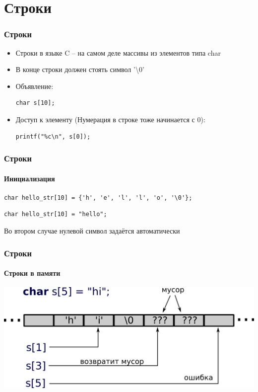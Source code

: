 \documentclass[12pt,pdf,hyperref={unicode}]{beamer}
\begin{document}
\section{Строки}

\begin{frame}[fragile]
\frametitle{Строки} 
\begin{itemize}
\item Строки в языке C -- на самом деле массивы из элементов типа char
\item В конце строки должен стоять символ '\textbackslash 0'
\item Объявление:
\begin{lstlisting}
char s[10];
\end{lstlisting}
\item Доступ к элементу
(Нумерация в строке тоже начинается с 0):\\
\begin{lstlisting}
printf("%c\n", s[0]);
\end{lstlisting}
\end{itemize}
\end{frame}


\begin{frame}[fragile]
\frametitle{Строки} 
\framesubtitle{Инициализация}
\begin{lstlisting}
char hello_str[10] = {'h', 'e', 'l', 'l', 'o', '\0'};
\end{lstlisting}
\begin{lstlisting}
char hello_str[10] = "hello";
\end{lstlisting}
Во втором случае нулевой символ задаётся автоматически
\end{frame}

\begin{frame}[fragile]
\frametitle{Строки} 
\framesubtitle{Строки в памяти}
\begin{center}
\includegraphics[width=0.95\linewidth]{images/string_in_memory.png}
\end{center}
\end{frame}
\end{document}

